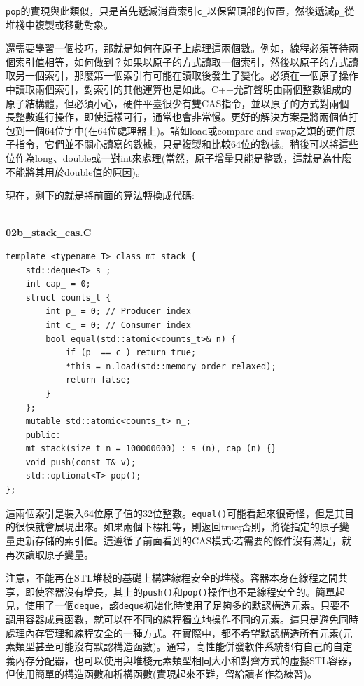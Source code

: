 \texttt{pop}的實現與此類似，只是首先遞減消費索引\texttt{c\_}以保留頂部的位置，然後遞減\texttt{p\_}從堆棧中複製或移動對象。

還需要學習一個技巧，那就是如何在原子上處理這兩個數。例如，線程必須等待兩個索引值相等，如何做到？如果以原子的方式讀取一個索引，然後以原子的方式讀取另一個索引，那麼第一個索引有可能在讀取後發生了變化。必須在一個原子操作中讀取兩個索引，對索引的其他運算也是如此。C++允許聲明由兩個整數組成的原子結構體，但必須小心，硬件平臺很少有雙CAS指令，並以原子的方式對兩個長整數進行操作，即使這樣可行，通常也會非常慢。更好的解決方案是將兩個值打包到一個64位字中(在64位處理器上)。諸如load或compare-and-swap之類的硬件原子指令，它們並不關心讀寫的數據，只是複製和比較64位的數據。稍後可以將這些位作為long、double或一對int來處理(當然，原子增量只能是整數，這就是為什麼不能將其用於double值的原因)。

現在，剩下的就是將前面的算法轉換成代碼:

\hspace*{\fill} \\ %
\noindent
\textbf{02b\_stack\_cas.C}
\begin{lstlisting}[style=styleCXX]
template <typename T> class mt_stack {
	std::deque<T> s_;
	int cap_ = 0;
	struct counts_t {
		int p_ = 0; // Producer index
		int c_ = 0; // Consumer index
		bool equal(std::atomic<counts_t>& n) {
			if (p_ == c_) return true;
			*this = n.load(std::memory_order_relaxed);
			return false;
		}
	};
	mutable std::atomic<counts_t> n_;
	public:
	mt_stack(size_t n = 100000000) : s_(n), cap_(n) {}
	void push(const T& v);
	std::optional<T> pop();
};
\end{lstlisting}

這兩個索引是裝入64位原子值的32位整數。\texttt{equal()}可能看起來很奇怪，但是其目的很快就會展現出來。如果兩個下標相等，則返回true;否則，將從指定的原子變量更新存儲的索引值。這遵循了前面看到的CAS模式:若需要的條件沒有滿足，就再次讀取原子變量。

注意，不能再在STL堆棧的基礎上構建線程安全的堆棧。容器本身在線程之間共享，即使容器沒有增長，其上的\texttt{push()}和\texttt{pop()}操作也不是線程安全的。簡單起見，使用了一個\texttt{deque}，該\texttt{deque}初始化時使用了足夠多的默認構造元素。只要不調用容器成員函數，就可以在不同的線程獨立地操作不同的元素。這只是避免同時處理內存管理和線程安全的一種方式。在實際中，都不希望默認構造所有元素(元素類型甚至可能沒有默認構造函數)。通常，高性能併發軟件系統都有自己的自定義內存分配器，也可以使用與堆棧元素類型相同大小和對齊方式的虛擬STL容器，但使用簡單的構造函數和析構函數(實現起來不難，留給讀者作為練習)。

